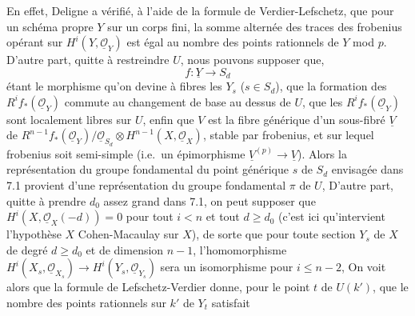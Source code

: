 \documentclass[11pt,a4paper]{article}
\begin{document}
En effet, Deligne a vérifié, à l'aide de la formule de Verdier-Lefschetz, que pour un
schéma propre $Y$ sur un corps fini, la somme alternée des traces des frobenius
 opérant sur $H^i(Y, \underline{\mathcal{O}}_Y)$ est égal au
nombre des points rationnels de $Y$ mod $p$. D'autre part, quitte à restreindre $U$, nous
pouvons supposer que,
\[ f\colon \underline{Y} \longrightarrow S_d \]
étant le morphisme qu'on devine à fibres les $Y_s$ ($s \in S_d$), que  la formation des $R^i f_{*}(\underline{\mathcal{O}}_Y)$ commute au
changement de base au dessus de $U$, que les $R^i f_{*}(\underline{\mathcal{O}}_Y)$
sont localement libres sur $U$, enfin que $V$ est la fibre générique d'un sous-fibré
$\underline{V}$ de $R^{n-1} f_{*}(\underline{\mathcal{O}}_Y) /
\underline{\mathcal{O}}_{S_d} \otimes H^{n-1}(X, \underline{\mathcal{O}}_X)$,
stable par frobenius, et sur lequel frobenius soit semi-simple (i.e.\ un
épimorphisme $\underline{V}^{(p)} \to \underline{V}$). Alors la représentation du
groupe fondamental du point générique $s$ de $S_d$ envisagée dans 7.1 provient
d'une représentation du groupe fondamental $\pi$ de $U$,  D'autre part,
quitte à prendre $d_0$ assez grand dans 7.1, on peut supposer que $H^i(X,
\underline{\mathcal{O}}_X(-d)) = 0$ pour tout $i < n$ et tout $d \geqslant d_0$
(c'est ici qu'intervient l'hypothèse $X$ Cohen-Macaulay sur $X$), de sorte que pour
toute section $Y_s$ de $X$ de degré $d \geqslant d_0$ et de dimension $n-1$,
l'homomorphisme $H^i(X_s, \underline{\mathcal{O}}_{X_s}) \to H^i(Y_s,
\underline{\mathcal{O}}_{Y_s})$ sera un isomorphisme pour $i \leqslant n-2$,
 On voit alors
que la formule de Lefschetz-Verdier donne, pour le point  $t$ de
$U(k')$, que le nombre des points rationnels sur $k'$ de $Y_t$
satisfait
\end{document}
